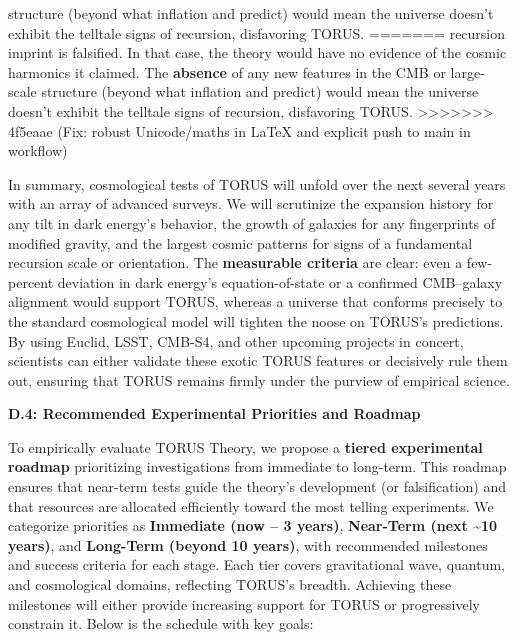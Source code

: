 \documentclass[]{article}
\begin{document}
\begin{itemize}
\begin{itemize}
    structure (beyond what inflation and \LambdaCDM predict) would mean the
    universe doesn't exhibit the telltale signs of recursion,
    disfavoring TORUS.
=======
    recursion imprint is falsified​. In that case, the theory would have
    no evidence of the cosmic harmonics it claimed. The \textbf{absence}
    of any new features in the CMB or large-scale structure (beyond what
    inflation and \LambdaCDM predict) would mean the universe doesn't exhibit
    the telltale signs of recursion, disfavoring TORUS.
>>>>>>> 4f5eaae (Fix: robust Unicode/maths in LaTeX and explicit push to main in workflow)
  \end{itemize}
\end{itemize}

In summary, cosmological tests of TORUS will unfold over the next
several years with an array of advanced surveys. We will scrutinize the
expansion history for any tilt in dark energy's behavior, the growth of
galaxies for any fingerprints of modified gravity, and the largest
cosmic patterns for signs of a fundamental recursion scale or
orientation. The \textbf{measurable criteria} are clear: even a
few-percent deviation in dark energy's equation-of-state or a confirmed
CMB--galaxy alignment would support TORUS, whereas a universe that
conforms precisely to the standard cosmological model will tighten the
noose on TORUS's predictions. By using Euclid, LSST, CMB-S4, and other
upcoming projects in concert, scientists can either validate these
exotic TORUS features or decisively rule them out, ensuring that TORUS
remains firmly under the purview of empirical science.

\textbf{D.4: Recommended Experimental Priorities and Roadmap}

To empirically evaluate TORUS Theory, we propose a \textbf{tiered
experimental roadmap} prioritizing investigations from immediate to
long-term. This roadmap ensures that near-term tests guide the theory's
development (or falsification) and that resources are allocated
efficiently toward the most telling experiments. We categorize
priorities as \textbf{Immediate (now -- 3 years)}, \textbf{Near-Term
(next \textasciitilde{}10 years)}, and \textbf{Long-Term (beyond 10
years)}, with recommended milestones and success criteria for each
stage. Each tier covers gravitational wave, quantum, and cosmological
domains, reflecting TORUS's breadth. Achieving these milestones will
either provide increasing support for TORUS or progressively constrain
it. Below is the schedule with key goals:
\end{document}
